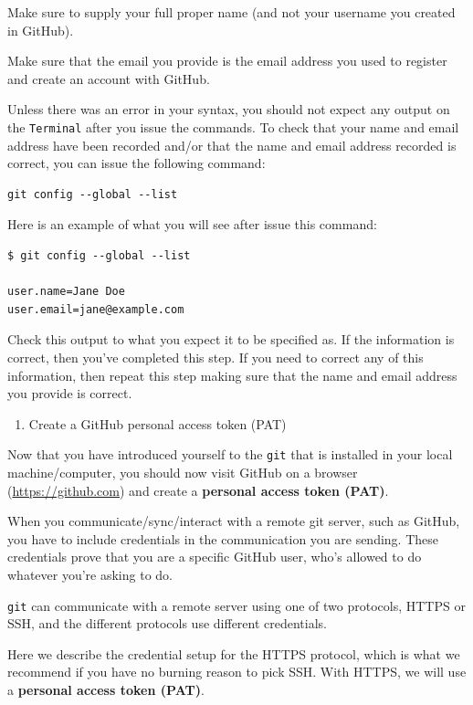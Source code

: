 \documentclass[
  12pt,
]{book}
\providecommand{\tightlist}{%
  \setlength{\itemsep}{0pt}\setlength{\parskip}{0pt}}
\begin{document}
Make sure to supply your full proper name (and not your username you created in GitHub).

Make sure that the email you provide is the email address you used to register and create an account with GitHub.

Unless there was an error in your syntax, you should not expect any output on the \texttt{Terminal} after you issue the commands. To check that your name and email address have been recorded and/or that the name and email address recorded is correct, you can issue the following command:

\begin{verbatim}
git config --global --list
\end{verbatim}

Here is an example of what you will see after issue this command:

\begin{verbatim}
$ git config --global --list

user.name=Jane Doe
user.email=jane@example.com
\end{verbatim}

Check this output to what you expect it to be specified as. If the information is correct, then you've completed this step. If you need to correct any of this information, then repeat this step making sure that the name and email address you provide is correct.

\begin{enumerate}
\def\labelenumi{\arabic{enumi}.}
\setcounter{enumi}{2}
\tightlist
\item
  Create a GitHub personal access token (PAT)
\end{enumerate}

Now that you have introduced yourself to the \texttt{git} that is installed in your local machine/computer, you should now visit GitHub on a browser (\url{https://github.com}) and create a \textbf{personal access token (PAT)}.

When you communicate/sync/interact with a remote git server, such as GitHub, you have to include credentials in the communication you are sending. These credentials prove that you are a specific GitHub user, who's allowed to do whatever you're asking to do.

\texttt{git} can communicate with a remote server using one of two protocols, HTTPS or SSH, and the different protocols use different credentials.

Here we describe the credential setup for the HTTPS protocol, which is what we recommend if you have no burning reason to pick SSH. With HTTPS, we will use a \textbf{personal access token (PAT)}.
\end{document}
